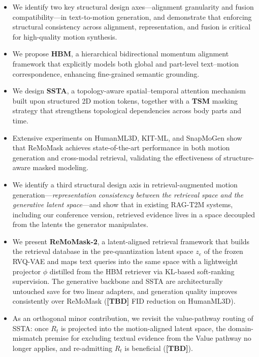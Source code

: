 \documentclass[10pt,journal,compsoc]{IEEEtran}
\begin{document}
\begin{itemize}
    \item We identify two key structural design axes—alignment granularity and fusion compatibility—in text-to-motion generation, and demonstrate that enforcing structural consistency across alignment, representation, and fusion is critical for high-quality motion synthesis.
    
    \item We propose \textbf{HBM}, a hierarchical bidirectional momentum alignment framework that explicitly models both global and part-level text–motion correspondence, enhancing fine-grained semantic grounding.
    
    \item We design \textbf{SSTA}, a topology-aware spatial–temporal attention mechanism built upon structured 2D motion tokens, together with a \textbf{TSM} masking strategy that strengthens topological dependencies across body parts and time.
    
    \item Extensive experiments on HumanML3D, KIT-ML, and SnapMoGen show that ReMoMask achieves state-of-the-art performance in both motion generation and cross-modal retrieval, validating the effectiveness of structure-aware masked modeling.

    \item We identify a third structural design axis in retrieval-augmented motion generation---\emph{representation consistency between the retrieval space and the generative latent space}---and show that in existing RAG-T2M systems, including our conference version, retrieved evidence lives in a space decoupled from the latents the generator manipulates.

    \item We present \textbf{ReMoMask-2}, a latent-aligned retrieval framework that builds the retrieval database in the pre-quantization latent space $z_e$ of the frozen RVQ-VAE and maps text queries into the same space with a lightweight projector $\phi$ distilled from the HBM retriever via KL-based soft-ranking supervision. The generative backbone and SSTA are architecturally untouched save for two linear adapters, and generation quality improves consistently over ReMoMask (\textbf{[TBD]} FID reduction on HumanML3D).

    \item As an orthogonal minor contribution, we revisit the value-pathway routing of SSTA: once $R_t$ is projected into the motion-aligned latent space, the domain-mismatch premise for excluding textual evidence from the Value pathway no longer applies, and re-admitting $R_t$ is beneficial (\textbf{[TBD]}).
\end{itemize}
\end{document}
